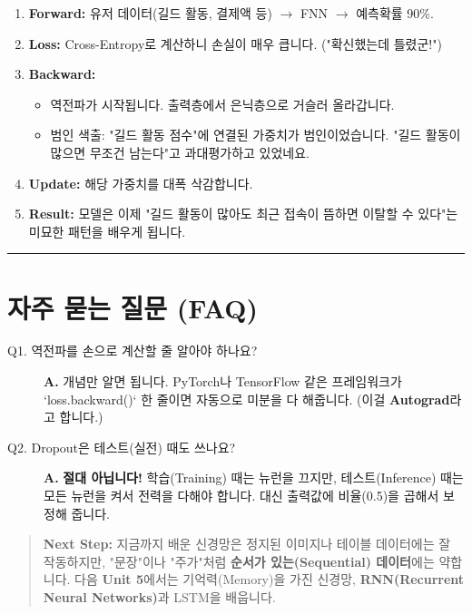 \documentclass[11pt,a4paper]{book}
\theoremstyle{definition}
\begin{document}
\begin{enumerate}
    \item \textbf{Forward:} 유저 데이터(길드 활동, 결제액 등) $\to$ FNN $\to$ 예측확률 90\%.
    \item \textbf{Loss:} Cross-Entropy로 계산하니 손실이 매우 큽니다. ("확신했는데 틀렸군!")
    \item \textbf{Backward:}
    \begin{itemize}
        \item 역전파가 시작됩니다. 출력층에서 은닉층으로 거슬러 올라갑니다.
        \item 범인 색출: "길드 활동 점수"에 연결된 가중치가 범인이었습니다. "길드 활동이 많으면 무조건 남는다"고 과대평가하고 있었네요.
    \end{itemize}
    \item \textbf{Update:} 해당 가중치를 대폭 삭감합니다.
    \item \textbf{Result:} 모델은 이제 "길드 활동이 많아도 최근 접속이 뜸하면 이탈할 수 있다"는 미묘한 패턴을 배우게 됩니다.
\end{enumerate}

\vspace{0.5cm}\hrule\vspace{0.5cm}

\section{자주 묻는 질문 (FAQ)}

\begin{description}
    \item[Q1. 역전파를 손으로 계산할 줄 알아야 하나요?]
    \textbf{A.} 개념만 알면 됩니다. PyTorch나 TensorFlow 같은 프레임워크가 `loss.backward()` 한 줄이면 자동으로 미분을 다 해줍니다. (이걸 \textbf{Autograd}라고 합니다.)
    
    \item[Q2. Dropout은 테스트(실전) 때도 쓰나요?]
    \textbf{A.} \textbf{절대 아닙니다!} 학습(Training) 때는 뉴런을 끄지만, 테스트(Inference) 때는 모든 뉴런을 켜서 전력을 다해야 합니다. 대신 출력값에 비율(0.5)을 곱해서 보정해 줍니다.
\end{description}

\vspace{1cm}
\begin{quote}
\textbf{Next Step:} 지금까지 배운 신경망은 정지된 이미지나 테이블 데이터에는 잘 작동하지만, "문장"이나 "주가"처럼 \textbf{순서가 있는(Sequential) 데이터}에는 약합니다. 다음 \textbf{Unit 5}에서는 기억력(Memory)을 가진 신경망, \textbf{RNN(Recurrent Neural Networks)}과 LSTM을 배웁니다.
\end{quote}
\end{document}

